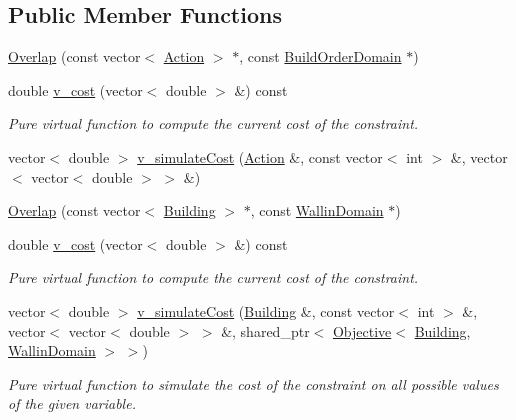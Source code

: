 \subsection*{Public Member Functions}
\begin{DoxyCompactItemize}
\item 
\hyperlink{classghost_1_1Overlap_ab0968eeda4433f417c1e38675d38fe75}{Overlap} (const vector$<$ \hyperlink{classghost_1_1Action}{Action} $>$ $\ast$, const \hyperlink{classghost_1_1BuildOrderDomain}{Build\-Order\-Domain} $\ast$)
\item 
double \hyperlink{classghost_1_1Overlap_a7a926991f06c785126e5d7995953e493}{v\-\_\-cost} (vector$<$ double $>$ \&) const 
\begin{DoxyCompactList}\small\item\em Pure virtual function to compute the current cost of the constraint. \end{DoxyCompactList}\item 
vector$<$ double $>$ \hyperlink{classghost_1_1Overlap_a2130361801f50c5a35594097982655b7}{v\-\_\-simulate\-Cost} (\hyperlink{classghost_1_1Action}{Action} \&, const vector$<$ int $>$ \&, vector$<$ vector$<$ double $>$ $>$ \&)
\item 
\hyperlink{classghost_1_1Overlap_a256dfd7655e1937ed0d13368527e9eec}{Overlap} (const vector$<$ \hyperlink{classghost_1_1Building}{Building} $>$ $\ast$, const \hyperlink{classghost_1_1WallinDomain}{Wallin\-Domain} $\ast$)
\item 
double \hyperlink{classghost_1_1Overlap_a7a926991f06c785126e5d7995953e493}{v\-\_\-cost} (vector$<$ double $>$ \&) const 
\begin{DoxyCompactList}\small\item\em Pure virtual function to compute the current cost of the constraint. \end{DoxyCompactList}\item 
vector$<$ double $>$ \hyperlink{classghost_1_1Overlap_a3a347d3067235b29bbb19c2013498edf}{v\-\_\-simulate\-Cost} (\hyperlink{classghost_1_1Building}{Building} \&, const vector$<$ int $>$ \&, vector$<$ vector$<$ double $>$ $>$ \&, shared\-\_\-ptr$<$ \hyperlink{classghost_1_1Objective}{Objective}$<$ \hyperlink{classghost_1_1Building}{Building}, \hyperlink{classghost_1_1WallinDomain}{Wallin\-Domain} $>$ $>$)
\begin{DoxyCompactList}\small\item\em Pure virtual function to simulate the cost of the constraint on all possible values of the given variable. \end{DoxyCompactList}\end{DoxyCompactItemize}
